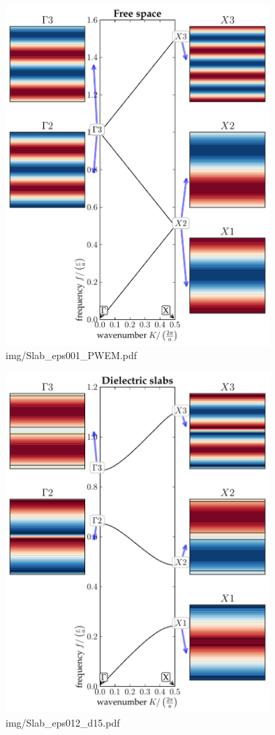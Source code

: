 \begin{figure} \caption{img/Slab\_eps001\_PWEM.pdf}  \centering \includegraphics[width=10cm]{img/Slab_eps001_PWEM.pdf} \end{figure} \clearpage
\begin{figure} \caption{img/Slab\_eps012\_d15.pdf}  \centering \includegraphics[width=10cm]{img/Slab_eps012_d15.pdf} \end{figure} \clearpage

